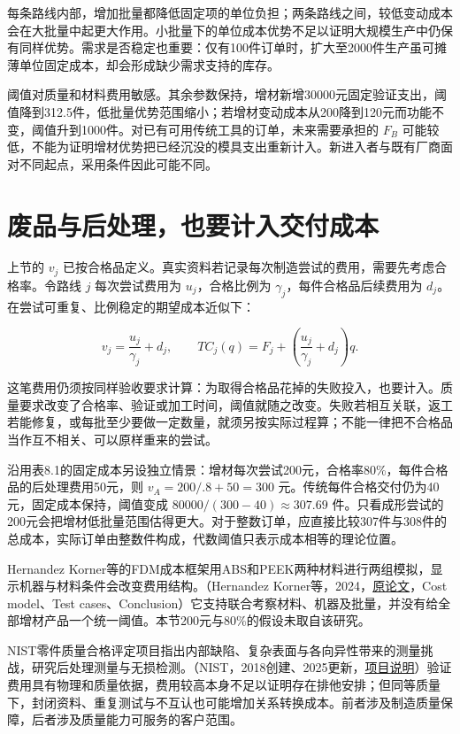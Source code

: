 \documentclass[UTF8,fontset=windows,12pt,a4paper,oneside,openany]{ctexbook}
\begin{document}
每条路线内部，增加批量都降低固定项的单位负担；两条路线之间，较低变动成本会在大批量中起更大作用。小批量下的单位成本优势不足以证明大规模生产中仍保有同样优势。需求是否稳定也重要：仅有100件订单时，扩大至2000件生产虽可摊薄单位固定成本，却会形成缺少需求支持的库存。

阈值对质量和材料费用敏感。其余参数保持，增材新增30000元固定验证支出，阈值降到312.5件，低批量优势范围缩小；若增材变动成本从200降到120元而功能不变，阈值升到1000件。对已有可用传统工具的订单，未来需要承担的 $F_B$ 可能较低，不能为证明增材优势把已经沉没的模具支出重新计入。新进入者与既有厂商面对不同起点，采用条件因此可能不同。

\section{废品与后处理，也要计入交付成本}

上节的 $v_j$ 已按合格品定义。真实资料若记录每次制造尝试的费用，需要先考虑合格率。令路线 $j$ 每次尝试费用为 $u_j$，合格比例为 $\gamma_j$，每件合格品后续费用为 $d_j$。在尝试可重复、比例稳定的期望成本近似下：

\[
v_j=\frac{u_j}{\gamma_j}+d_j,\qquad
TC_j(q)=F_j+\left(\frac{u_j}{\gamma_j}+d_j\right)q.
\]

这笔费用仍须按同样验收要求计算：为取得合格品花掉的失败投入，也要计入。质量要求改变了合格率、验证或加工时间，阈值就随之改变。失败若相互关联，返工若能修复，或每批至少要做一定数量，就须另按实际过程算；不能一律把不合格品当作互不相关、可以原样重来的尝试。

沿用表8.1的固定成本另设独立情景：增材每次尝试200元，合格率80\%，每件合格品的后处理费用50元，则 $v_A=200/.8+50=300$ 元。传统每件合格交付仍为40元，固定成本保持，阈值变成 $80000/(300-40)\approx307.69$ 件。只看成形尝试的200元会把增材低批量范围估得更大。对于整数订单，应直接比较307件与308件的总成本，实际订单由整数件构成，代数阈值只表示成本相等的理论位置。

Hernandez Korner等的FDM成本框架用ABS和PEEK两种材料进行两组模拟，显示机器与材料条件会改变费用结构。（Hernandez Korner等，2024，\href{https://pmc.ncbi.nlm.nih.gov/articles/PMC10880658/}{原论文}，Cost model、Test cases、Conclusion）它支持联合考察材料、机器及批量，并没有给全部增材产品一个统一阈值。本节200元与80\%的假设未取自该研究。

NIST零件质量合格评定项目指出内部缺陷、复杂表面与各向异性带来的测量挑战，研究后处理测量与无损检测。（NIST，2018创建、2025更新，\href{https://www.nist.gov/programs-projects/additive-manufacturing-part-qualification}{项目说明}）验证费用具有物理和质量依据，费用较高本身不足以证明存在排他安排；但同等质量下，封闭资料、重复测试与不互认也可能增加关系转换成本。前者涉及制造质量保障，后者涉及质量能力可服务的客户范围。
\end{document}
